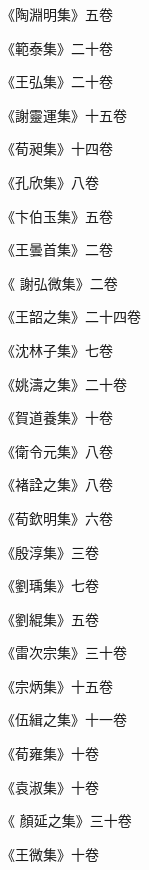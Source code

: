 \begin{pinyinscope}
 《陶淵明集》五卷



 《範泰集》二十卷



 《王弘集》二十卷



 《謝靈運集》十五卷



 《荀昶集》十四卷



 《孔欣集》八卷



 《卞伯玉集》五卷



 《王曇首集》二卷



 《
 謝弘微集》二卷



 《王韶之集》二十四卷



 《沈林子集》七卷



 《姚濤之集》二十卷



 《賀道養集》十卷



 《衛令元集》八卷



 《褚詮之集》八卷



 《荀欽明集》六卷



 《殷淳集》三卷



 《劉瑀集》七卷



 《劉緄集》五卷



 《雷次宗集》三十卷



 《宗炳集》十五卷



 《伍緝之集》十一卷



 《荀雍集》十卷



 《袁淑集》十卷



 《
 顏延之集》三十卷



 《王微集》十卷




\end{pinyinscope}
